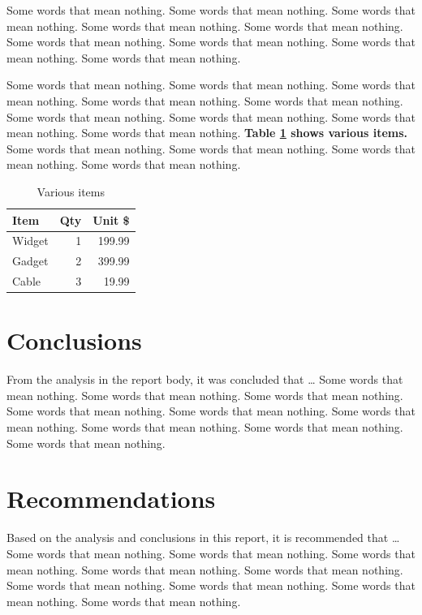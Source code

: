 \documentclass[11pt, a4paper]{article}
\begin{document}
Some words that mean nothing. Some words that mean nothing. Some words that mean nothing. Some words that mean nothing. Some words that mean nothing. Some words that mean nothing. Some words that mean nothing. Some words that mean nothing. Some words that mean nothing.

Some words that mean nothing. Some words that mean nothing. Some words that mean nothing. Some words that mean nothing. Some words that mean nothing. Some words that mean nothing. Some words that mean nothing. Some words that mean nothing. Some words that mean nothing. {\textbf{Table \ref{tab:var_items} shows various items.}} Some words that mean nothing. Some words that mean nothing. Some words that mean nothing. Some words that mean nothing.

\begin{table}[!htbp]
    \centering
    \caption{Various items}
    \medskip
    \label{tab:var_items}
    \begin{tabular}{lrr} 
        \hline
        \textbf{Item}   & \textbf{Qty}   & \textbf{Unit} \$   \\
        \hline
        Widget & 1     & 199.99    \\
        Gadget & 2     & 399.99    \\
        Cable  & 3     & 19.99     \\
        \hline
    \end{tabular}
\end{table}

\section{Conclusions}
From the analysis in the report body, it was concluded that \ldots 
Some words that mean nothing. Some words that mean nothing. Some words that mean nothing. Some words that mean nothing. Some words that mean nothing. Some words that mean nothing. Some words that mean nothing. Some words that mean nothing. Some words that mean nothing.

\section{Recommendations}
Based on the analysis and conclusions in this report, it is recommended that \ldots 
Some words that mean nothing. Some words that mean nothing. Some words that mean nothing. Some words that mean nothing. Some words that mean nothing. Some words that mean nothing. Some words that mean nothing. Some words that mean nothing. Some words that mean nothing.
\end{document}
